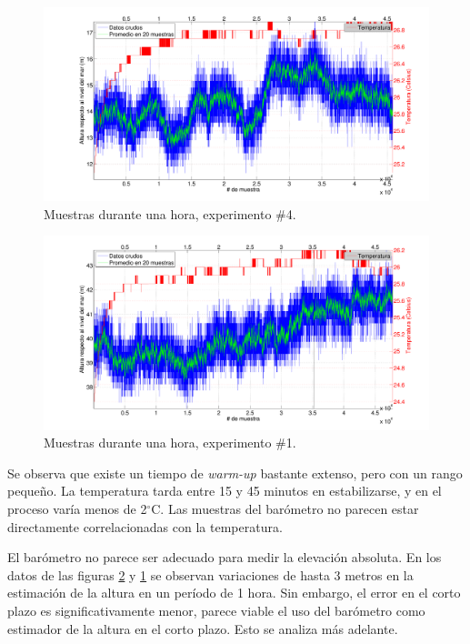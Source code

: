\documentclass[spanish,12pt,a4paper,titlepage]{report}
\newcommand{\degc}{$^\circ$C}
\begin{document}
\begin{figure}[h!]
  \includegraphics[width=.9\textwidth]{./pics/1hora_04.pdf}
  \caption{Muestras durante una hora, experimento \#4.}
  \label{fig:1hora_04.pdf}
\end{figure}
\vspace{-20pt}
\begin{figure}[h!]
  \includegraphics[width=.9\textwidth]{./pics/1hora_01.pdf}
  \caption{Muestras durante una hora, experimento \#1.}
  \label{fig:1hora_01.pdf}
\end{figure}


Se observa que existe un tiempo de \textit{warm-up} bastante extenso, pero con un rango pequeño. La temperatura tarda entre 15 y 45 minutos en estabilizarse, y en el proceso varía menos de 2\degc. Las muestras del barómetro no parecen estar directamente correlacionadas con la temperatura.

El barómetro no parece ser adecuado para medir la elevación absoluta. En los datos de las figuras \ref{fig:1hora_01.pdf} y \ref{fig:1hora_04.pdf} se observan variaciones de hasta 3 metros en la estimación de la altura en un período de 1 hora. Sin embargo, el error en el corto plazo es significativamente menor, parece viable el uso del barómetro como estimador de la altura en el corto plazo. Esto se analiza más adelante.
\end{document}
